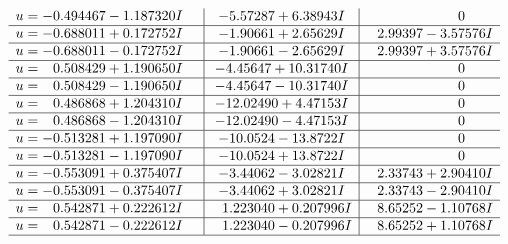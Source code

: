 \documentclass[1p]{elsarticle_modified}
\theoremstyle{definition}
\begin{document}
$$\begin{array}{c|c|c}
\begin{aligned}
u &= -0.494467 - 1.187320 I\end{aligned}
 & -5.57287 + 6.38943 I & \phantom{-0.000000 } 0 \\ \hline\begin{aligned}
u &= -0.688011 + 0.172752 I\end{aligned}
 & -1.90661 + 2.65629 I & \phantom{-}2.99397 - 3.57576 I \\ \hline\begin{aligned}
u &= -0.688011 - 0.172752 I\end{aligned}
 & -1.90661 - 2.65629 I & \phantom{-}2.99397 + 3.57576 I \\ \hline\begin{aligned}
u &= \phantom{-}0.508429 + 1.190650 I\end{aligned}
 & -4.45647 + 10.31740 I & \phantom{-0.000000 } 0 \\ \hline\begin{aligned}
u &= \phantom{-}0.508429 - 1.190650 I\end{aligned}
 & -4.45647 - 10.31740 I & \phantom{-0.000000 } 0 \\ \hline\begin{aligned}
u &= \phantom{-}0.486868 + 1.204310 I\end{aligned}
 & -12.02490 + 4.47153 I & \phantom{-0.000000 } 0 \\ \hline\begin{aligned}
u &= \phantom{-}0.486868 - 1.204310 I\end{aligned}
 & -12.02490 - 4.47153 I & \phantom{-0.000000 } 0 \\ \hline\begin{aligned}
u &= -0.513281 + 1.197090 I\end{aligned}
 & -10.0524 - 13.8722 I & \phantom{-0.000000 } 0 \\ \hline\begin{aligned}
u &= -0.513281 - 1.197090 I\end{aligned}
 & -10.0524 + 13.8722 I & \phantom{-0.000000 } 0 \\ \hline\begin{aligned}
u &= -0.553091 + 0.375407 I\end{aligned}
 & -3.44062 - 3.02821 I & \phantom{-}2.33743 + 2.90410 I \\ \hline\begin{aligned}
u &= -0.553091 - 0.375407 I\end{aligned}
 & -3.44062 + 3.02821 I & \phantom{-}2.33743 - 2.90410 I \\ \hline\begin{aligned}
u &= \phantom{-}0.542871 + 0.222612 I\end{aligned}
 & \phantom{-}1.223040 + 0.207996 I & \phantom{-}8.65252 - 1.10768 I \\ \hline\begin{aligned}
u &= \phantom{-}0.542871 - 0.222612 I\end{aligned}
 & \phantom{-}1.223040 - 0.207996 I & \phantom{-}8.65252 + 1.10768 I\\
 \hline 
 \end{array}$$\newpage
\end{document}
